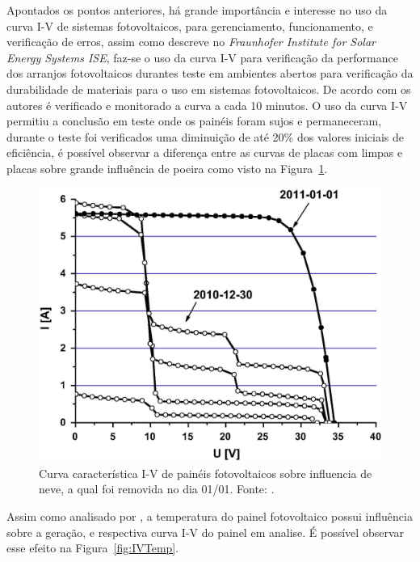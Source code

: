 Apontados os pontos anteriores, há grande importância e interesse no uso da curva I-V de sistemas fotovoltaicos, para gerenciamento, funcionamento, e verificação de erros, assim como descreve  no \textit{Fraunhofer Institute for Solar Energy Systems ISE}, faz-se o uso da curva I-V para verificação da performance dos arranjos fotovoltaicos durantes teste em ambientes abertos para verificação da durabilidade de materiais para o uso em sistemas fotovoltaicos. De acordo com os autores é verificado e monitorado a curva a cada 10 minutos. O uso da curva I-V permitiu a conclusão em teste onde os painéis foram sujos e permaneceram, durante o teste foi verificados uma diminuição de até 20\% dos valores iniciais de eficiência, é possível observar a diferença entre as curvas de placas com limpas e placas sobre grande influência de poeira como visto na Figura~\ref{fig:CurvaIVNeve}.

\FloatBarrier
\begin{figure}[!htbp]
	\centering
	\includegraphics[scale=1.5]{imagens/IxV_schill}
	\caption{Curva característica I-V de painéis fotovoltaicos sobre influencia de neve, a qual foi removida no dia 01/01. Fonte: . }

	\label{fig:CurvaIVNeve}
\end{figure}
\FloatBarrier

Assim como analisado por  , a temperatura do painel fotovoltaico possui influência sobre a geração, e respectiva curva I-V do painel em analise. É possível observar esse efeito na Figura~\ref{fig:IVTemp}.


